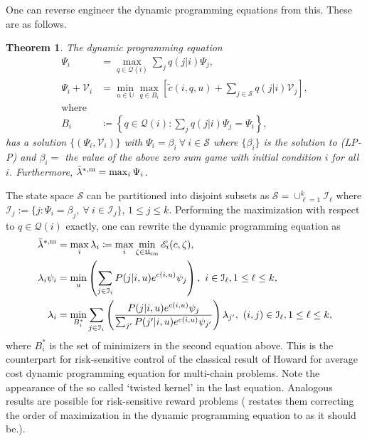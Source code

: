 \documentclass[notitlepage,11pt,reqno]{amsart}
\numberwithin{equation}{section}
\theoremstyle{plain}
\newtheorem{theorem}{Theorem}[section]
\theoremstyle{definition}
\theoremstyle{remark}
\newcommand{\Act}{{\mathds{U}}}
\newcommand{\sE}{{\mathscr{E}}}     %
\newcommand{\cI}{{\mathcal{I}}}
\newcommand{\cS}{{\mathcal{S}}}     %
\newcommand{\Usm}{\mathfrak{U}_{\mathrm{sm}}}
\newcommand{\df}{\coloneqq}
\begin{document}
One can reverse engineer the dynamic programming equations from this. These are as follows.

\begin{theorem}
The dynamic programming equation
\begin{align*}
\Psi_i  &= \max_{q\in\mathcal{Q}(i)}\sum_jq(j|i)\Psi_j, 
\\
\Psi_i + \mathcal{V}_i &= \min_{u\in\Act}\max_{q\in B_i}\left[\tilde{c}(i,q,u) + 
\sum_{j\in\cS} q(j|i) \mathcal{V}_j\right], 
\\
\mbox{where} \ & \
  \\
B_i &\df \left\{q \in \mathcal{Q}(i) : \sum_j q(j|i)\Psi_j = \Psi_i\right\},
\end{align*}
has a solution $\{(\Psi_i, \mathcal{V}_i)\}$ with  $\Psi_i = \beta_i \ \forall\  i\in\cS$ where $\{\beta_i\}$ is the solution to (LP-P) and $\beta_i =$ the value of the above zero sum game with initial condition $i$ for all $i$. Furthermore, 
$\bar\lambda^{*,{\rm m}} = \max_i\Psi_i$. 
\end{theorem}

The state space $\cS$ can be partitioned into disjoint subsets as $\cS = \cup_{\ell = 1}^k\cI_\ell$ where $\cI_j := \{j : \Psi_i = \beta_j, \  \forall \ i\in \cI_j\}$, $1 \leq j \leq k$.
Performing the maximization with respect to $q\in\mathcal{Q}(i)$  exactly, one can rewrite the dynamic programming equation as
\begin{align*}
\bar\lambda^{*,{\rm m}} &= \max_i\lambda_i\df \max_i \min_{\zeta\in\Usm}\sE_i(c,\zeta), 
\\
\lambda_i\psi_i &= \min_u\left(\sum_{j\in\cI_i}P(j|i,u)e^{c(i,u)}\psi_j\right), \ i \in \cI_\ell, 1 \leq \ell \leq k, 
\\
\lambda_i &= \min_{B_i^*}\sum_{j\in\cI_i}\left(\frac{P(j|i,u)e^{c(i,u)}\psi_j}{\sum_{j'}P(j'|i,u)e^{c(i,u)}\psi_{j'}}\right)\lambda_{j'}, \ (i,j) \in \cI_\ell, 1 \leq \ell \leq k,
\end{align*}
where ${B}^*_i$ is the set of minimizers in the second equation above. This is the counterpart for risk-sensitive control of the classical result of Howard \cite{Howard} for average cost dynamic programming equation for multi-chain problems. Note the appearance of the so called `twisted kernel' in the last equation. Analogous results are possible  for risk-sensitive reward problems \cite{BorkarCDC} (\cite{9683319} restates them correcting the order of maximization in the dynamic programming equation to as it should be.).
\end{document}
